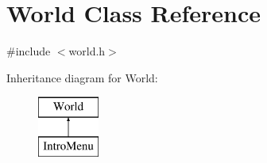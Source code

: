 \hypertarget{class_world}{\section{World Class Reference}
\label{class_world}
}


{\ttfamily \#include $<$world.\-h$>$}

Inheritance diagram for World\-:\begin{figure}[H]
\begin{center}
\leavevmode
\includegraphics[height=2.000000cm]{class_world}
\end{center}
\end{figure}
